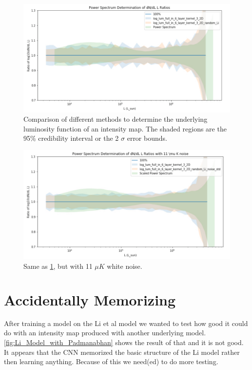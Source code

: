 \documentclass{article}
\begin{document}
		\begin{figure}[H]
			\centering
			\includegraphics[width=1.1\textwidth]{no_noise_compare.pdf}
			\caption{Comparison of different methods to determine the underlying luminosity function of an intensity map.  The shaded regions are the 95\% credibility interval or the 2 \(\sigma\) error bounds.}
			\label{fig:no_noise_compare}
		\end{figure}

		\begin{figure}[H]
			\centering
			\includegraphics[width=1.1\textwidth]{noise_compare.pdf}
			\caption{Same as \cref{fig:no_noise_compare}, but with 11 \(\mu K\) white noise.}
			\label{fig:noise_compare}
		\end{figure}

	\section{Accidentally Memorizing} \label{sec:mem}
		After training a model on the Li et al model we wanted to test how good it could do with an intensity map produced with another underlying model.  \cref{fig:Li_Model_with_Padmanabhan} shows the result of that and it is not good.  It appears that the CNN memorized the basic structure of the Li model rather then learning anything.  Because of this we need(ed) to do more testing.  
\end{document}
